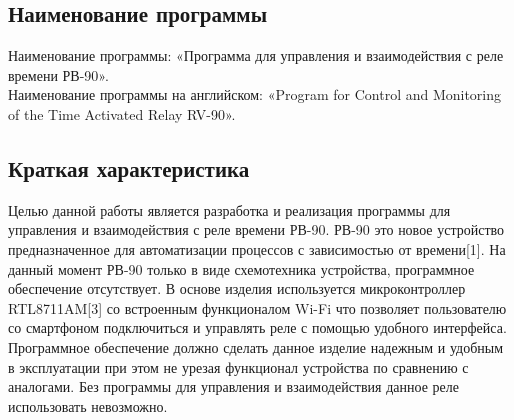 \subsection{Наименование программы}
Наименование программы: «Программа для управления и взаимодействия с реле времени РВ-90». \\
Наименование программы на английском: «Program for Control and Monitoring of the Time Activated Relay RV-90». \\


\subsection{Краткая характеристика}
Целью данной работы является разработка и реализация программы для управления и взаимодействия с реле времени РВ-90. РВ-90 это новое устройство предназначенное для автоматизации процессов с зависимостью от времени[1]. На данный момент РВ-90 только в виде схемотехника устройства, программное обеспечение отсутствует. В основе изделия используется микроконтроллер RTL8711AM[3] со встроенным функционалом Wi-Fi что позволяет пользователю со смартфоном подключиться и управлять реле с помощью удобного интерфейса. Программное обеспечение должно сделать данное изделие надежным и удобным в эксплуатации при этом не урезая функционал устройства по сравнению с аналогами. Без программы для управления и взаимодействия данное реле использовать невозможно.
